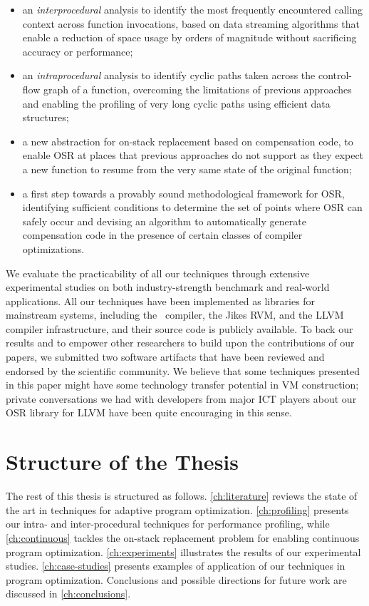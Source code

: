 \begin{itemize}
 \item an {\em interprocedural} analysis to identify the most frequently encountered calling context across function invocations, based on data streaming algorithms that enable a reduction of space usage by orders of magnitude without sacrificing accuracy or performance;
 \item an {\em intraprocedural} analysis to identify cyclic paths taken across the control-flow graph of a function, overcoming the limitations of previous approaches and enabling the profiling of very long cyclic paths using efficient data structures;
 \item a new abstraction for on-stack replacement based on compensation code, to enable OSR at places that previous approaches do not support as they expect a new function to resume from the very same state of the original function;
 \item a first step towards a provably sound methodological framework for OSR, identifying sufficient conditions to determine the set of points where OSR can safely occur and devising an algorithm to automatically generate compensation code in the presence of certain classes of compiler optimizations.
\end{itemize}

\noindent We evaluate the practicability of all our techniques through extensive experimental studies on both industry-strength benchmark and real-world applications. All our techniques have been implemented as libraries for mainstream systems, including the \gcc\ compiler, the Jikes RVM, and the LLVM compiler infrastructure, and their source code is publicly available. To back our results and to empower other researchers to build upon the contributions of our papers, we submitted two software artifacts that have been reviewed and endorsed by the scientific community. We believe that some techniques presented in this paper might have some technology transfer potential in VM construction; private conversations we had with developers from major ICT players about our OSR library for LLVM have been quite encouraging in this sense.

\section{Structure of the Thesis}

The rest of this thesis is structured as follows. \mychapter\ref{ch:literature} reviews the state of the art in techniques for adaptive program optimization. \mychapter\ref{ch:profiling} presents our intra- and inter-procedural techniques for performance profiling, while \mychapter\ref {ch:continuous} tackles the on-stack replacement problem for enabling continuous program optimization. \mychapter\ref{ch:experiments} illustrates the results of our experimental studies. \mychapter\ref{ch:case-studies} presents examples of application of our techniques in program optimization. Conclusions and possible directions for future work are discussed in \mychapter\ref{ch:conclusions}.

